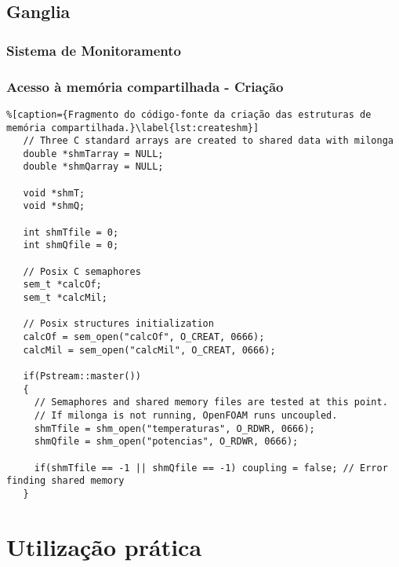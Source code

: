 \documentclass[svgnames,smaller,table]{beamer}
\begin{document}
\subsection{Ganglia}
\begin{frame}
  \frametitle{Sistema de Monitoramento}
\end{frame}



\begin{frame}[fragile]
  \frametitle{Acesso à memória compartilhada - Criação}
 \begin{lstlisting}%[caption={Fragmento do código-fonte da criação das estruturas de memória compartilhada.}\label{lst:createshm}]
   // Three C standard arrays are created to shared data with milonga
   double *shmTarray = NULL;
   double *shmQarray = NULL;
   
   void *shmT;
   void *shmQ;

   int shmTfile = 0;
   int shmQfile = 0;
   
   // Posix C semaphores
   sem_t *calcOf;
   sem_t *calcMil;
   
   // Posix structures initialization
   calcOf = sem_open("calcOf", O_CREAT, 0666);
   calcMil = sem_open("calcMil", O_CREAT, 0666);
   
   if(Pstream::master())
   {
     // Semaphores and shared memory files are tested at this point.
     // If milonga is not running, OpenFOAM runs uncoupled.
     shmTfile = shm_open("temperaturas", O_RDWR, 0666);
     shmQfile = shm_open("potencias", O_RDWR, 0666);
    
     if(shmTfile == -1 || shmQfile == -1) coupling = false; // Error finding shared memory
   }
 \end{lstlisting}
\end{frame}


\section{Utilização prática}
\end{document}
